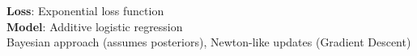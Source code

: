 \textbf{Loss}: Exponential loss function\\
\textbf{Model}: Additive logistic regression\\
Bayesian approach (assumes posteriors),
Newton-like updates (Gradient Descent)


